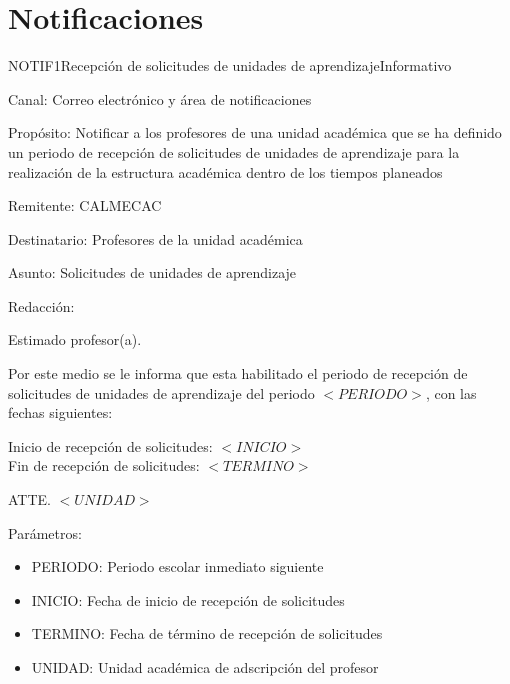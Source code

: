 \chapter{Notificaciones}
\label{ch:notif}

\begin{mensaje}{NOTIF1}{Recepción de solicitudes de unidades de aprendizaje}{Informativo}
	
	\item[Canal:] Correo electrónico y área de notificaciones
	
	\item[Propósito:] Notificar a los profesores de una unidad académica que se ha definido un periodo de recepción de solicitudes de unidades de aprendizaje para la realización de la estructura académica dentro de los tiempos planeados
	
	\item[Remitente:] CALMECAC
	
	\item[Destinatario:] Profesores de la unidad académica
	
	\item[Asunto:] Solicitudes de unidades de aprendizaje

	\item[Redacción:]

		Estimado profesor(a).

		Por este medio se le informa que esta habilitado el periodo de recepción de solicitudes de unidades de aprendizaje del periodo $<PERIODO>$, con las fechas siguientes:

		Inicio de recepción de solicitudes: $<INICIO>$\\
		Fin de recepción de solicitudes: $<TERMINO>$

		ATTE.
		$<UNIDAD>$

	\item[Parámetros:] 

		\begin{itemize}
			\item PERIODO: Periodo escolar inmediato siguiente
			\item INICIO: Fecha de inicio de recepción de solicitudes
			\item TERMINO: Fecha de término de recepción de solicitudes
			\item UNIDAD: Unidad académica de adscripción del profesor
		\end{itemize}
		


\end{mensaje}

